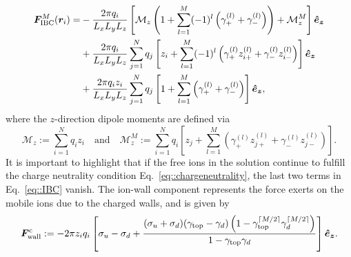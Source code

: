 \begin{equation}\label{eq::IBC}
\begin{split}
\bm{F}_{\text{IBC}}^{M}(\bm{r}_i)=&-\frac{2\pi q_{i}}{L_xL_yL_z}\left[\mathcal{M}_{z}\left(1+\sum_{l=1}^{M}(-1)^{l}\left(\gamma_{+}^{(l)}+\gamma_{-}^{(l)}\right)\right)+\mathcal{M}_{z}^{M}\right]\boldsymbol{\hat e_z}\\
&+\frac{2\pi q_i}{L_xL_yL_z}\sum_{j=1}^{N}q_j\left[z_i+\sum_{l=1}^{M}(-1)^{l}\left(\gamma_{+}^{(l)}z_{i+}^{(l)}+\gamma_{-}^{(l)}z_{i-}^{(l)}\right)\right]\boldsymbol{\hat e_z}\\
&+\frac{2\pi q_iz_i}{L_xL_yL_z}\sum_{j=1}^{N}q_j\left[1+\sum_{l=1}^{M}\left(\gamma_{+}^{(l)}+\gamma_{-}^{(l)}\right)\right]\boldsymbol{\hat e_z},
\end{split}
\end{equation}
where the $z$-direction dipole moments are defined via
\begin{equation}
\mathcal{M}_{z}:=\sum_{i=1}^{N}q_iz_i\quad\text{and}\quad \mathcal{M}_{z}^{M}:=\sum_{i=1}^{N}q_i\left[z_{j}+\sum_{l=1}^{M}\left(\gamma_{+}^{(l)}z_{j+}^{(l)}+\gamma_{-}^{(l)}z_{j-}^{(l)}\right)\right].
\end{equation}
It is important to highlight that if the free ions in the solution continue to fulfill the charge neutrality condition Eq.~\eqref{eq::chargeneutrality}, the last two terms in Eq.~\eqref{eq::IBC} vanish. 
The ion-wall component represents the force exerts on the mobile ions due to the charged walls, and is given by
\begin{equation}
\bm{F}_{\text{wall}}^{\text{c}}:=-2\pi z_{i}q_{i}\left[\sigma_u-\sigma_d+\frac{(\sigma_u+\sigma_d)(\gamma_{\text{top}}-\gamma_{d})\left(1-\gamma_{\text{top}}^{\lceil M/2 \rceil}\gamma_{d}^{\lceil M/2 \rceil}\right)}{1-\gamma_{\text{top}}\gamma_{d}}\right]\boldsymbol{\hat e_z}.
\end{equation}
